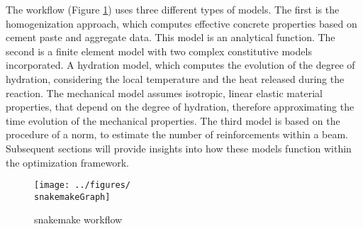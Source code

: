 The workflow (Figure \ref{fig:snakemake_workflow}) uses three different types of models. 
The first is the homogenization approach, which computes effective concrete properties based on cement paste and aggregate data.
This model is an analytical function.
The second is a finite element model with two complex constitutive models incorporated.
A hydration model, which computes the evolution of the degree of hydration, considering the local temperature and the heat released during the reaction.
The mechanical model assumes isotropic, linear elastic material properties, that depend on the degree of hydration, therefore approximating the time evolution of the mechanical properties.
The third model is based on the procedure of a norm, to estimate the number of reinforcements within a beam.
Subsequent sections will provide insights into how these models function within the optimization framework.
\begin{figure}[ht]%
	\centering
	\texttt{[image: ../figures/\\snakemakeGraph]}
	\caption{snakemake workflow }\label{fig:snakemake_workflow}
\end{figure}